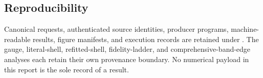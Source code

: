 \documentclass[11pt]{article}
\begin{document}
\subsection{Reproducibility}

Canonical requests, authenticated source identities, producer programs, machine-readable
results, figure manifests, and execution records are retained under
.  The gauge, literal-shell, refitted-shell,
fidelity-ladder, and comprehensive-band-edge analyses each retain their own provenance
boundary.  No numerical payload in this report is the sole record of a result.



\end{document}
